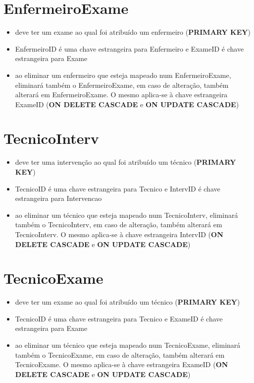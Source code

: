 \documentclass[article, a4paper, 12pt, oneside]{memoir}
\begin{document}
\section*{EnfermeiroExame}
\begin{itemize}
	\item deve ter um exame ao qual foi atribuído um enfermeiro (\textbf{PRIMARY KEY})
	\item EnfermeiroID é uma chave estrangeira para Enfermeiro e ExameID é chave estrangeira para Exame
	\item ao eliminar um enfermeiro que esteja mapeado num EnfermeiroExame, eliminará também o EnfermeiroExame, em caso de alteração, também alterará em EnfermeiroExame. O mesmo aplica-se à chave estrangeira ExameID (\textbf{ON DELETE CASCADE} e \textbf{ON UPDATE CASCADE})
\end{itemize}

\section*{TecnicoInterv}
\begin{itemize}
	\item deve ter uma intervenção ao qual foi atribuído um técnico (\textbf{PRIMARY KEY})
	\item TecnicoID é uma chave estrangeira para Tecnico e IntervID é chave estrangeira para Intervencao
	\item ao eliminar um técnico que esteja mapeado num TecnicoInterv, eliminará também o TecnicoInterv, em caso de alteração, também alterará em TecnicoInterv. O mesmo aplica-se à chave estrangeira IntervID (\textbf{ON DELETE CASCADE} e \textbf{ON UPDATE CASCADE})
\end{itemize}

\section*{TecnicoExame}
\begin{itemize}
	\item deve ter um exame ao qual foi atribuído um técnico (\textbf{PRIMARY KEY})
	\item TecnicoID é uma chave estrangeira para Tecnico e ExameID é chave estrangeira para Exame
	\item ao eliminar um técnico que esteja mapeado num TecnicoExame, eliminará também o TecnicoExame, em caso de alteração, também alterará em TecnicoExame. O mesmo aplica-se à chave estrangeira ExameID (\textbf{ON DELETE CASCADE} e \textbf{ON UPDATE CASCADE})
\end{itemize}
\end{document}
